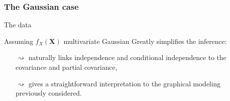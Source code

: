 \begin{frame}
  \frametitle{The Gaussian case}

  \begin{block}{The data}
  \end{block}

  \begin{block}{Assuming $f_X(\mathbf{X})$ multivariate Gaussian}
    Greatly simplifies the inference:
    \begin{itemize}
    \item[$\rightsquigarrow$]   naturally   links   independence   and
      conditional   independence  to   the   covariance  and   partial
      covariance,
    \item[$\rightsquigarrow$]  gives a  straightforward interpretation
      to the graphical modeling previously considered.
  \end{itemize}
  \end{block}
\end{frame}


